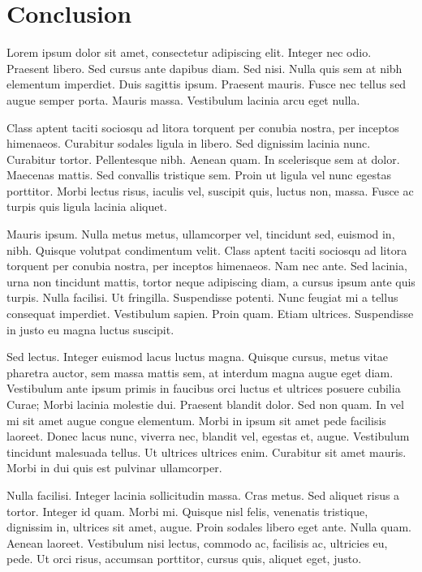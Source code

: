 \chapter{Conclusion}

Lorem ipsum dolor sit amet, consectetur adipiscing elit. Integer nec
odio. Praesent libero. Sed cursus ante dapibus diam. Sed nisi. Nulla
quis sem at nibh elementum imperdiet. Duis sagittis ipsum. Praesent
mauris. Fusce nec tellus sed augue semper porta. Mauris massa.
Vestibulum lacinia arcu eget nulla.

Class aptent taciti sociosqu ad litora torquent per conubia nostra, per
inceptos himenaeos. Curabitur sodales ligula in libero. Sed dignissim
lacinia nunc. Curabitur tortor. Pellentesque nibh. Aenean quam. In
scelerisque sem at dolor. Maecenas mattis. Sed convallis tristique sem.
Proin ut ligula vel nunc egestas porttitor. Morbi lectus risus, iaculis
vel, suscipit quis, luctus non, massa. Fusce ac turpis quis ligula
lacinia aliquet.

Mauris ipsum. Nulla metus metus, ullamcorper vel, tincidunt sed, euismod
in, nibh. Quisque volutpat condimentum velit. Class aptent taciti
sociosqu ad litora torquent per conubia nostra, per inceptos himenaeos.
Nam nec ante. Sed lacinia, urna non tincidunt mattis, tortor neque
adipiscing diam, a cursus ipsum ante quis turpis. Nulla facilisi. Ut
fringilla. Suspendisse potenti. Nunc feugiat mi a tellus consequat
imperdiet. Vestibulum sapien. Proin quam. Etiam ultrices. Suspendisse in
justo eu magna luctus suscipit.

Sed lectus. Integer euismod lacus luctus magna. Quisque cursus, metus
vitae pharetra auctor, sem massa mattis sem, at interdum magna augue
eget diam. Vestibulum ante ipsum primis in faucibus orci luctus et
ultrices posuere cubilia Curae; Morbi lacinia molestie dui. Praesent
blandit dolor. Sed non quam. In vel mi sit amet augue congue elementum.
Morbi in ipsum sit amet pede facilisis laoreet. Donec lacus nunc,
viverra nec, blandit vel, egestas et, augue. Vestibulum tincidunt
malesuada tellus. Ut ultrices ultrices enim. Curabitur sit amet mauris.
Morbi in dui quis est pulvinar ullamcorper.

Nulla facilisi. Integer lacinia sollicitudin massa. Cras metus. Sed
aliquet risus a tortor. Integer id quam. Morbi mi. Quisque nisl felis,
venenatis tristique, dignissim in, ultrices sit amet, augue. Proin
sodales libero eget ante. Nulla quam. Aenean laoreet. Vestibulum nisi
lectus, commodo ac, facilisis ac, ultricies eu, pede. Ut orci risus,
accumsan porttitor, cursus quis, aliquet eget, justo.

